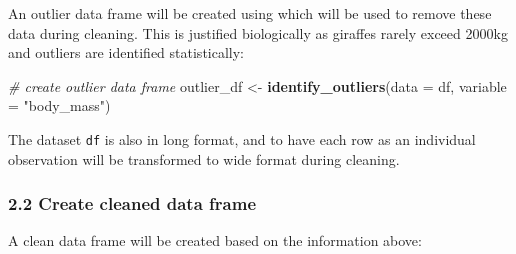 \documentclass[
]{article}
\newenvironment{Shaded}{\begin{snugshade}}{\end{snugshade}}
\newcommand{\AttributeTok}[1]{\textcolor[rgb]{0.13,0.29,0.53}{#1}}
\newcommand{\CommentTok}[1]{\textcolor[rgb]{0.56,0.35,0.01}{\textit{#1}}}
\newcommand{\FunctionTok}[1]{\textcolor[rgb]{0.13,0.29,0.53}{\textbf{#1}}}
\newcommand{\NormalTok}[1]{#1}
\newcommand{\OtherTok}[1]{\textcolor[rgb]{0.56,0.35,0.01}{#1}}
\newcommand{\StringTok}[1]{\textcolor[rgb]{0.31,0.60,0.02}{#1}}
\begin{document}
An outlier data frame will be created using which will be used to remove
these data during cleaning. This is justified biologically as giraffes
rarely exceed 2000kg and outliers are identified statistically:

\begin{Shaded}
\begin{Highlighting}[]
\CommentTok{\# create outlier data frame}
\NormalTok{outlier\_df }\OtherTok{\textless{}{-}} \FunctionTok{identify\_outliers}\NormalTok{(}\AttributeTok{data =}\NormalTok{ df,}
                  \AttributeTok{variable =} \StringTok{"body\_mass"}\NormalTok{)}
\end{Highlighting}
\end{Shaded}

The dataset \texttt{df} is also in long format, and to have each row as
an individual observation will be transformed to wide format during
cleaning.

\subsubsection{2.2 Create cleaned data
frame}\label{create-cleaned-data-frame}

A clean data frame will be created based on the information above:
\end{document}
